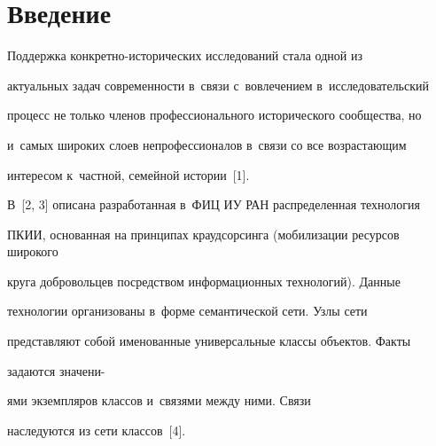  \thispagestyle{headings}


 


 \vspace*{-24pt}


 


\section{Введение}





\vspace*{-3pt}








  Поддержка конкретно-исторических исследований стала одной из 


актуальных задач современности в~связи с~вовлечением в~исследовательский 


процесс не только членов профессионального исторического сообщества, но 


и~самых широких слоев непрофессионалов в~связи со все возрастающим 


интересом к~частной, семейной истории~[1].


  


  В~[2, 3] описана разработанная в~ФИЦ ИУ РАН распределенная технология 


 ПКИИ,  основанная на принципах краудсорсинга (мобилизации ресурсов широкого 


круга добровольцев посредством информационных технологий). Данные 


технологии организованы в~форме семантической сети. Узлы сети 


представляют собой именованные универсальные классы объектов. Факты 


задаются значени-\linebreak\vspace*{-12pt}





\pagebreak





\noindent


ями экземпляров классов и~связями между ними. Связи 


наследуются из сети классов~[4].


